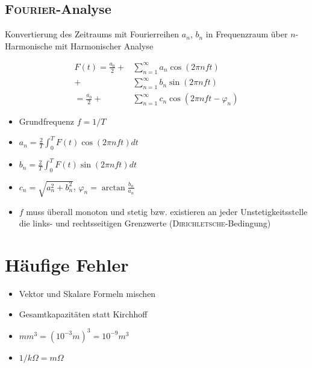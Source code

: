 \subsection{\textsc{Fourier}-Analyse}

Konvertierung des Zeitraums mit Fourierreihen $a_n$, $b_n$ in Frequenzraum über $n$-Harmonische mit Harmonischer Analyse

\begin{align*}
  F(t) = \frac{a_0}{2} + & \sum_{n = 1}^{\infty} a_n \cos (2\pi nft)             \\
  +                      & \sum_{n = 1}^{\infty} b_n \sin (2\pi nft)             \\
  = \frac{a_0}{2} +      & \sum_{n = 1}^{\infty} c_n \cos (2\pi nft - \varphi_n)
\end{align*}

\begin{itemize}
  \item Grundfrequenz $f = 1/T$
  \item $a_n = \frac{2}{T} \int_{0}^{T} F(t) \cos (2\pi nft) dt$
  \item $b_n = \frac{2}{T} \int_{0}^{T} F(t) \sin (2\pi nft) dt$
  \item $c_n = \sqrt{a_n^2 + b_n^2}$, $\varphi_n = \arctan \frac{b_n}{a_n}$
  \item $f$ muss überall monoton und stetig bzw. existieren an jeder Unstetigkeitsstelle die links- und rechtsseitigen Grenzwerte (\textsc{Dirichletsche}-Bedingung)
\end{itemize}

\section{Häufige Fehler}

\begin{itemize}
  \item Vektor und Skalare Formeln mischen
  \item Gesamtkapazitäten statt Kirchhoff
  \item $mm^3 = (10^{-3} m)^3 = 10^{-9} m^3$
  \item $1/k\Omega = m\Omega$
\end{itemize}